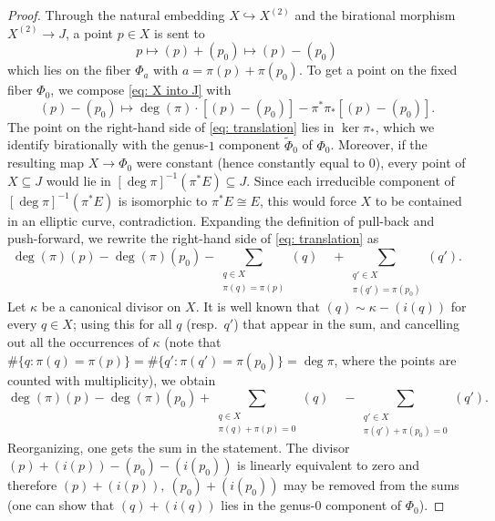 \documentclass[a4paper,twoside,english]{amsart}
\theoremstyle{plain}
\theoremstyle{definition}
\begin{document}
\begin{proof}
    Through the natural embedding $X \hookrightarrow X^{(2)}$ and the birational morphism $X^{(2)} \to J$, a point $p \in X$ is sent to
    \begin{equation}
        \label{eq: X into J}
        p \mapsto (p)+(p_0) \mapsto (p)-(p_0)
    \end{equation}
    which lies on the fiber $\Phi_a$ with $a = \pi(p)+\pi(p_0)$. To get a point on the fixed fiber $\Phi_0$, %
    we compose \eqref{eq: X into J} with
    \begin{equation}
    \label{eq: translation}
        (p)-(p_0) \mapsto \deg(\pi)\cdot [(p)-(p_0)] - \pi^\ast\pi_\ast[(p)-(p_0)].
    \end{equation}
    The point on the right-hand side of \eqref{eq: translation} lies in $\ker \pi_\ast$, which we identify birationally with the genus-$1$ component $\tilde{\Phi}_0$ of $\Phi_0$.
    Moreover, if the resulting map $X \to \Phi_0$ were constant (hence constantly equal to $0$), every point of $X \subseteq J$ would lie in $[\deg \pi]^{-1}\left(\pi^\ast E\right)\subseteq J$. Since each irreducible component of $[\deg \pi]^{-1}\left(\pi^\ast E\right)$ is isomorphic to $\pi^* E \cong E$, this would force $X$ to be contained in an elliptic curve, contradiction.
    Expanding the definition of pull-back and push-forward, we rewrite the right-hand side of \eqref{eq: translation} as
    \[
        \deg(\pi)(p)-\deg(\pi)(p_0)
        - \sum_{\substack{q \in X \\ \pi(q)=\pi(p)}} (q) \quad
        + \sum_{\substack{q' \in X \\ \pi(q')=\pi(p_0)}}(q').
    \] 
    Let $\kappa$ be a canonical divisor on $X$. It is well known that $(q) \sim \kappa - (i(q))$ for every $q \in X$; using this for all $q$ (resp.~$q'$) that appear in the sum, and cancelling out all the occurrences of $\kappa$ (note that $\#\{ q: \pi(q) = \pi(p)\} = \#\{ q' : \pi(q') = \pi(p_0) \} = \deg \pi$, where the points are counted with multiplicity), we obtain
    \[ 
        \deg(\pi)(p)-\deg(\pi)(p_0) 
        + \sum_{\substack{q \in X \\ \pi(q)+\pi(p)=0}} (q) \quad
        - \sum_{\substack{q' \in X \\ \pi(q')+\pi(p_0)=0}} (q').
    \]
    Reorganizing, one gets the sum in the statement. The divisor $(p)+(i(p))-(p_0)-(i(p_0))$ is linearly equivalent to zero and therefore $(p)+(i(p)), \ (p_0)+(i(p_0))$ may be removed from the sums (one can show that $(q)+(i(q))$ lies in the genus-0 component of $\Phi_0$).
\end{proof}
\end{document}
